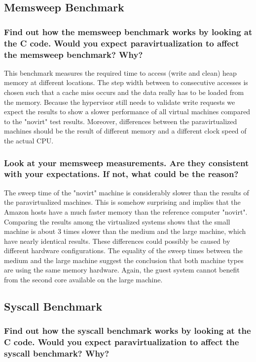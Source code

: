 \documentclass{article}
\begin{document}
\subsection{Memsweep Benchmark}

	\subsubsection{Find out how the memsweep benchmark works by looking at the C code. Would you expect paravirtualization to affect the memsweep benchmark? Why?}

This benchmark measures the required time to access (write and clean) heap memory at different locations. The step width between to consecutive accesses is chosen such that a cache miss occurs and the data really has to be loaded from the memory. Because the hypervisor still needs to validate write requests we expect the results to show a slower performance of all virtual machines compared to the "novirt" test results. Moreover, differences between the paravirtualized machines should be the result of different memory and a different clock speed of the actual CPU.

	\subsubsection{Look at your memsweep measurements. Are they consistent with your expectations. If not, what could be the reason?}

The sweep time of the "novirt" machine is considerably slower than the results of the paravirtualized machines. This is somehow surprising and implies that the Amazon hosts have a much faster memory than the reference computer "novirt". Comparing the results among the virtualized systems shows that the small machine is about 3 times slower than the medium and the large machine, which have nearly identical results. These differences could possibly be caused by different hardware configurations. The equality of the sweep times between the medium and the large machine suggest the conclusion that both machine types are using the same memory hardware. Again, the guest system cannot benefit from the second core available on the large machine.

\subsection{Syscall Benchmark}

	\subsubsection{Find out how the syscall benchmark works by looking at the C code. Would you expect paravirtualization to affect the syscall benchmark? Why?}
\end{document}
